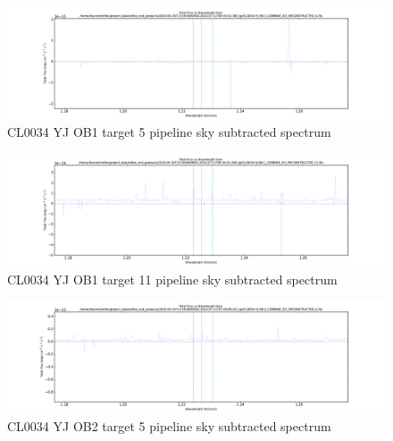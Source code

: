\documentclass[10pt,letterpaper]{article}
\begin{document}
\newpage 
\begin{figure}[h!]
\caption{CL0034 YJ OB1 target 5 pipeline sky subtracted spectrum}\label{fig:CL0034 YJ OB1 target 5 pipeline sky subtracted spectrum}
\includegraphics[scale=0.4]{figures/CL0034-YJ-OB-1_COMBINE_SCI_RECONSTRUCTED_5.pdf}
\end{figure}
\begin{figure}[h!]
\caption{CL0034 YJ OB1 target 11 pipeline sky subtracted spectrum}\label{fig:CL0034 YJ OB1 target 11 pipeline sky subtracted spectrum}
\includegraphics[scale=0.4]{figures/CL0034-YJ-OB-1_COMBINE_SCI_RECONSTRUCTED_11.pdf}
\end{figure}
\begin{figure}[h!]
\caption{CL0034 YJ OB2 target 5 pipeline sky subtracted spectrum}\label{fig:CL0034 YJ OB2 target 5 pipeline sky subtracted spectrum}
\includegraphics[scale=0.4]{figures/CL0034-YJ-OB-2_COMBINE_SCI_RECONSTRUCTED_5.pdf}
\end{figure}
\newpage
\end{document}
